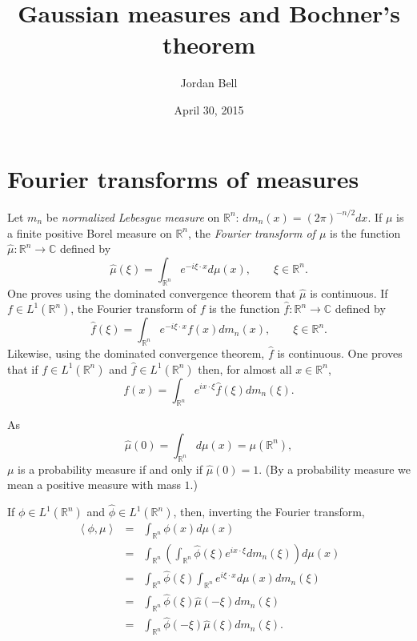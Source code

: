 \documentclass{article}
\newcommand{\inner}[2]{\left\langle #1, #2 \right\rangle}
\theoremstyle{definition}
\theoremstyle{definition}
\begin{document}
\title{Gaussian measures and Bochner's theorem}
\author{Jordan Bell}
\date{April 30, 2015}

\maketitle

\section{Fourier transforms of measures}
Let $m_n$ be {\em normalized Lebesgue measure} on $\mathbb{R}^n$: $dm_n(x) = (2\pi)^{-n/2} dx$. 
If $\mu$ is a finite  positive Borel  measure on $\mathbb{R}^n$, the {\em Fourier transform of $\mu$} is the function
$\hat{\mu}:\mathbb{R}^n \to \mathbb{C}$ defined by
\[
\hat{\mu}(\xi) = \int_{\mathbb{R}^n} e^{-i\xi \cdot x} d\mu(x), \qquad \xi \in \mathbb{R}^n.
\]
One proves using the dominated convergence theorem that $\hat{\mu}$ is continuous.
If $f \in L^1(\mathbb{R}^n)$, the Fourier transform of $f$ is the function $\hat{f}:\mathbb{R}^n \to \mathbb{C}$ defined by
\[
\hat{f}(\xi) = \int_{\mathbb{R}^n} e^{-i\xi\cdot x} f(x) dm_n(x), \qquad \xi \in \mathbb{R}^n.
\]
Likewise, using the dominated convergence theorem, $\hat{f}$ is continuous.
One proves that if $f \in L^1(\mathbb{R}^n)$ and $\hat{f} \in L^1(\mathbb{R}^n)$ then, for almost all $x \in \mathbb{R}^n$,
\[
f(x) = \int_{\mathbb{R}^n} e^{ix\cdot \xi} \hat{f}(\xi) dm_n(\xi).
\]

As
\[
\hat{\mu}(0)=\int_{\mathbb{R}^n} d\mu(x) = \mu(\mathbb{R}^n),
\]
$\mu$ is a probability measure if and only if $\hat{\mu}(0)=1$. (By a probability measure we mean a positive measure with mass $1$.)

If $\phi \in L^1(\mathbb{R}^n)$ and $\hat{\phi} \in L^1(\mathbb{R}^n)$, then, inverting the Fourier transform,
\begin{eqnarray*}
\inner{\phi}{\mu}&=&\int_{\mathbb{R}^n} \phi(x) d\mu(x)\\
&=&\int_{\mathbb{R}^n} \left(\int_{\mathbb{R}^n} \hat{\phi}(\xi) e^{ix\cdot \xi} dm_n(\xi) \right) d\mu(x)\\
&=& \int_{\mathbb{R}^n} \hat{\phi}(\xi) \int_{\mathbb{R}^n} e^{i\xi \cdot x} d\mu(x) dm_n(\xi)\\
&=&\int_{\mathbb{R}^n} \hat{\phi}(\xi) \hat{\mu}(-\xi) dm_n(\xi)\\
&=&\int_{\mathbb{R}^n} \hat{\phi}(-\xi) \hat{\mu}(\xi) dm_n(\xi).
\end{eqnarray*}
\end{document}
